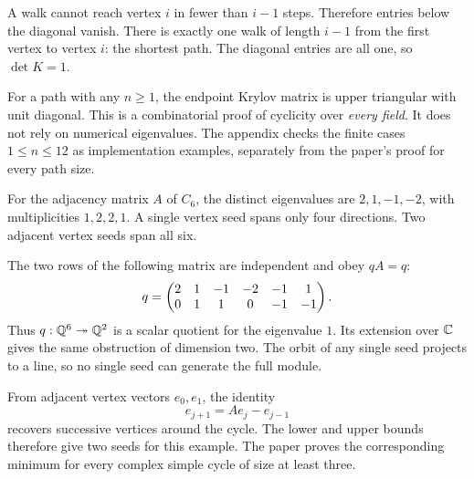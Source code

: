 A walk cannot reach vertex $i$ in fewer than $i-1$ steps. Therefore entries below the diagonal vanish. There is exactly one walk of length $i-1$ from the first vertex to vertex $i$: the shortest path. The diagonal entries are all one, so $\det K=1$.

For a path with any $n\ge1$, the endpoint Krylov matrix is upper triangular with unit diagonal. This is a combinatorial proof of cyclicity over \emph{every field}. It does not rely on numerical eigenvalues. The appendix checks the finite cases $1\le n\le12$ as implementation examples, separately from the paper's proof for every path size.


For the adjacency matrix $A$ of $C_6$, the distinct eigenvalues are $2,1,-1,-2$, with multiplicities $1,2,2,1$. A single vertex seed spans only four directions. Two adjacent vertex seeds span all six.


The two rows of the following matrix are independent and obey $qA=q$:
\[
q=\begin{pmatrix}2&1&-1&-2&-1&1\\0&1&1&0&-1&-1\end{pmatrix}.
\]
Thus $q:\mathbb Q^6\twoheadrightarrow\mathbb Q^2$ is a scalar quotient for the eigenvalue $1$. Its extension over $\mathbb C$ gives the same obstruction of dimension two. The orbit of any single seed projects to a line, so no single seed can generate the full module.

From adjacent vertex vectors $e_0,e_1$, the identity
\[
e_{j+1}=Ae_j-e_{j-1}
\]
recovers successive vertices around the cycle. The lower and upper bounds therefore give two seeds for this example. The paper proves the corresponding minimum for every complex simple cycle of size at least three.



